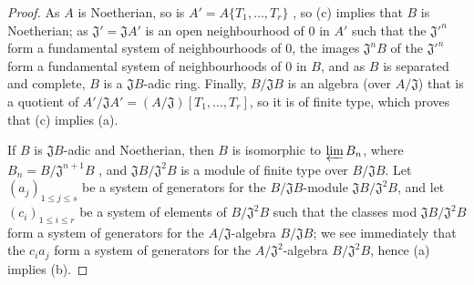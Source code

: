 \begin{proof}
As $A$ is Noetherian, so is $A'=A\{T_1,\dots,T_r\}$ , so
(c) implies that $B$ is Noetherian; as $\mathfrak{J}'=\mathfrak{J}A'$ is an open neighbourhood
of $0$ in $A'$ such that the ${\mathfrak{J}'}^n$ form a fundamental system of neighbourhoods of
$0$, the images $\mathfrak{J}^n B$ of the ${\mathfrak{J}'}^n$ form a fundamental system of
neighbourhoods of $0$ in $B$, and as $B$ is separated and complete, $B$ is a $\mathfrak{J}B$-adic
  ring. Finally, $B/\mathfrak{J}B$ is an algebra (over $A/\mathfrak{J}$) that is a quotient of
$A'/\mathfrak{J}A'=(A/\mathfrak{J})[T_1,\dots,T_r]$, so it is of finite type, which proves that
(c) implies (a).

If $B$ is $\mathfrak{J}B$-adic and Noetherian, then $B$ is isomorphic to $\varprojlim B_n$, where
$B_n=B/\mathfrak{J}^{n+1}B$ , and $\mathfrak{J}B/\mathfrak{J}^2 B$
is a module of finite type over $B/\mathfrak{J}B$. Let $(a_j)_{1\leq j\leq s}$ be a
system of generators for the $B/\mathfrak{J}B$-module $\mathfrak{J}B/\mathfrak{J}^2 B$, and let
$(c_i)_{1\leq i\leq r}$ be a system of elements of $B/\mathfrak{J}^2 B$ such that the
classes
mod $\mathfrak{J}B/\mathfrak{J}^2 B$ form a system of generators for the $A/\mathfrak{J}$-algebra
$B/\mathfrak{J}B$; we see immediately that the $c_i a_j$ form a system of generators for the
$A/\mathfrak{J}^2$-algebra $B/\mathfrak{J}^2 B$, hence (a) implies (b).


\end{proof}
